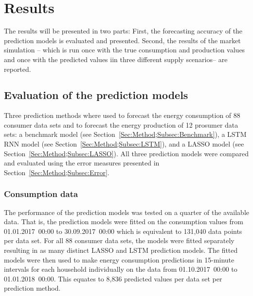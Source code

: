 
\section{Results}\label{Sec:Results}

The results will be presented in two parts: First, the forecasting accuracy of the prediction models is evaluated and presented. Second, the results of the market simulation -- which is run once with the true consumption and production values and once with the predicted values iin three different supply scenarios-- are reported.



\subsection{Evaluation of the prediction models}\label{Sec:Results;Subsec:Forecast}

Three prediction methods where used to forecast the energy consumption of 88 consumer data sets and to forecast the energy production of 12 prosumer data sets: a benchmark model (see Section~\ref{Sec:Method;Subsec:Benchmark}), a LSTM RNN model (see Section~\ref{Sec:Method;Subsec:LSTM}), and a LASSO model (see Section~\ref{Sec:Method;Subsec:LASSO}). All three prediction models were compared and evaluated using the error measures presented in Section~\ref{Sec:Method;Subsec:Error}.


\subsubsection{Consumption data}

The performance of the prediction models was tested on a quarter of the available data. That is, the prediction models were fitted on the consumption values from 01.01.2017~00:00 to 30.09.2017~00:00 which is equivalent to 131,040 data points per data set. For all 88 consumer data sets, the models were fitted separately resulting in as many distinct LASSO and LSTM prediction models. The fitted models were then used to make energy consumption predictions in 15-minute intervals for each household individually on the data from 01.10.2017~00:00 to 01.01.2018~00:00. This equates to 8,836 predicted values per data set per prediction method.

